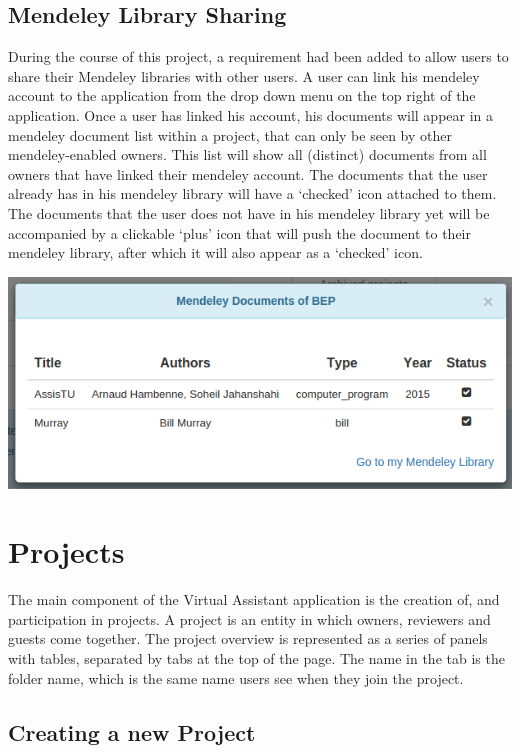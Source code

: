 \newpage

\subsection{Mendeley Library Sharing}

During the course of this project, a requirement had been added to allow users to share their Mendeley libraries with other users. A user can
link his mendeley account to the application from the drop down menu on the top right of the application. Once a user has linked his account,
his documents will appear in a mendeley document list within a project, that can only be seen by other mendeley-enabled owners. This list will show
all (distinct) documents from all owners that have linked their mendeley account. The documents that the user already has in his mendeley library
will have a `checked' icon attached to them. The documents that the user does not have in his mendeley library yet will be accompanied by a clickable 
`plus' icon that will push the document to their mendeley library, after which it will also appear as a `checked' icon.

\begin{center}
\includegraphics[scale=0.5]{./img/mendeley.png}
\end{center}

\section{Projects}

The main component of the Virtual Assistant application is the creation of, and participation in projects. A project is an entity in which owners, reviewers and 
guests come together. 
The project overview is represented as a series of panels with tables, separated by tabs at the top of the page. The name in the tab is the folder 
name, which is the same name users see when they join the project. 

\subsection{Creating a new Project}

